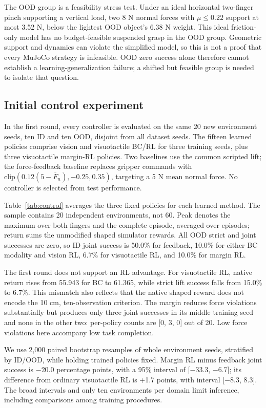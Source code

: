 \documentclass[letterpaper,10pt,conference]{ieeeconf}
\begin{document}
The OOD group is a feasibility stress test. Under an ideal horizontal two-finger pinch supporting a vertical load, two 8 N normal forces with $\mu\leq0.22$ support at most 3.52 N, below the lightest OOD object's 6.38 N weight. This ideal friction-only model has no budget-feasible suspended grasp in the OOD group. Geometric support and dynamics can violate the simplified model, so this is not a proof that every MuJoCo strategy is infeasible. OOD zero success alone therefore cannot establish a learning-generalization failure; a shifted but feasible group is needed to isolate that question.

\subsection{Initial control experiment}

In the first round, every controller is evaluated on the same 20 new environment seeds, ten ID and ten OOD, disjoint from all dataset seeds. The fifteen learned policies comprise vision and visuotactile BC/RL for three training seeds, plus three visuotactile margin-RL policies. Two baselines use the common scripted lift; the force-feedback baseline replaces gripper commands with $\mathrm{clip}(0.12(5-\overline F_n),-0.25,0.35)$, targeting a 5 N mean normal force. No controller is selected from test performance.

Table~\ref{tab:control} averages the three fixed policies for each learned method. The sample contains 20 independent environments, not 60. Peak denotes the maximum over both fingers and the complete episode, averaged over episodes; return sums the unmodified shaped simulator rewards. All OOD strict and joint successes are zero, so ID joint success is 50.0\% for feedback, 10.0\% for either BC modality and vision RL, 6.7\% for visuotactile RL, and 10.0\% for margin RL.

The first round does not support an RL advantage. For visuotactile RL, native return rises from 55.943 for BC to 61.365, while strict lift success falls from 15.0\% to 6.7\%. This mismatch also reflects that the native shaped reward does not encode the 10 cm, ten-observation criterion. The margin reduces force violations substantially but produces only three joint successes in its middle training seed and none in the other two: per-policy counts are [0, 3, 0] out of 20. Low force violations here accompany low task completion.

We use 2,000 paired bootstrap resamples of whole environment seeds, stratified by ID/OOD, while holding trained policies fixed. Margin RL minus feedback joint success is $-$20.0 percentage points, with a 95\% interval of [$-$33.3, $-$6.7]; its difference from ordinary visuotactile RL is +1.7 points, with interval [$-$8.3, 8.3]. The broad intervals and only ten environments per domain limit inference, including comparisons among training procedures.
\end{document}

